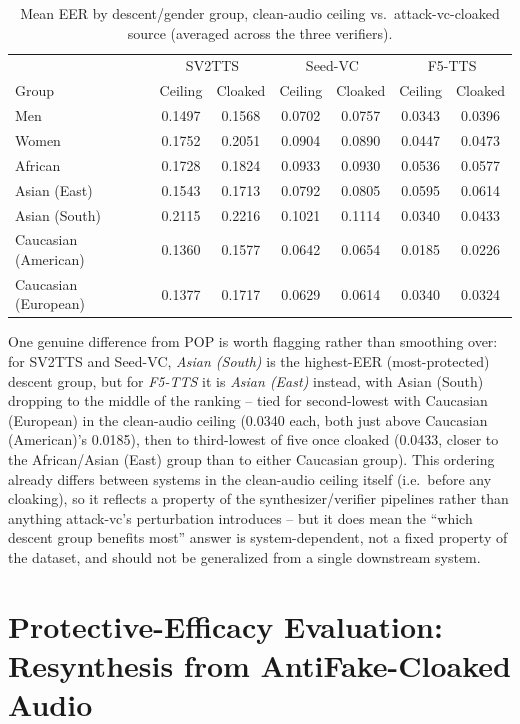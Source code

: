 \documentclass[11pt]{article}
\begin{document}
\begin{table}[H]
\centering
\caption{Mean EER by descent/gender group, clean-audio ceiling vs.\
attack-vc-cloaked source (averaged across the three verifiers).}
\label{tab:protective-efficacy-demographics-attackvc}
\begin{tabular}{lcccccc}
\toprule
& \multicolumn{2}{c}{SV2TTS} & \multicolumn{2}{c}{Seed-VC} & \multicolumn{2}{c}{F5-TTS} \\
Group & Ceiling & Cloaked & Ceiling & Cloaked & Ceiling & Cloaked \\
\midrule
Men                  & 0.1497 & 0.1568 & 0.0702 & 0.0757 & 0.0343 & 0.0396 \\
Women                & 0.1752 & 0.2051 & 0.0904 & 0.0890 & 0.0447 & 0.0473 \\
\addlinespace
African              & 0.1728 & 0.1824 & 0.0933 & 0.0930 & 0.0536 & 0.0577 \\
Asian (East)         & 0.1543 & 0.1713 & 0.0792 & 0.0805 & 0.0595 & 0.0614 \\
Asian (South)        & 0.2115 & 0.2216 & 0.1021 & 0.1114 & 0.0340 & 0.0433 \\
Caucasian (American)  & 0.1360 & 0.1577 & 0.0642 & 0.0654 & 0.0185 & 0.0226 \\
Caucasian (European)  & 0.1377 & 0.1717 & 0.0629 & 0.0614 & 0.0340 & 0.0324 \\
\bottomrule
\end{tabular}
\end{table}

One genuine difference from POP is worth flagging rather than
smoothing over: for SV2TTS and Seed-VC, \emph{Asian (South)} is the
highest-EER (most-protected) descent group, but for \emph{F5-TTS} it
is \emph{Asian (East)} instead, with Asian (South) dropping to the
middle of the ranking -- tied for second-lowest with Caucasian
(European) in the clean-audio ceiling (0.0340 each, both just above
Caucasian (American)'s 0.0185), then to third-lowest of five once
cloaked (0.0433, closer to the African/Asian (East) group than to
either Caucasian group). This ordering already differs between
systems in the clean-audio ceiling itself (i.e.\ before any cloaking),
so it reflects a property of the synthesizer/verifier pipelines rather
than anything attack-vc's perturbation introduces -- but it does mean
the ``which descent group benefits most'' answer is system-dependent,
not a fixed property of the dataset, and should not be generalized
from a single downstream system.

\section{Protective-Efficacy Evaluation: Resynthesis from AntiFake-Cloaked Audio}
\label{sec:protective-efficacy-antifake}
\end{document}
